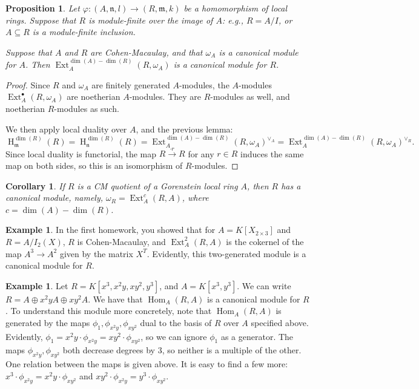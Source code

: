 \documentclass[11pt]{book}
\newtheorem{proposition}[theorem]{Proposition}
\newtheorem{corollary}[theorem]{Corollary}
\numberwithin{equation}{section}
\numberwithin{theorem}{chapter}
\theoremstyle{definition}
\newtheorem{example}[theorem]{Example}
\newtheorem*{basic properties}{Basic Properties}
\newtheorem*{Important Remark}{Important Remark}
\theoremstyle{remark}
\newcommand{\m}{\mathfrak{m}}
\newcommand{\n}{\mathfrak{n}}
\newcommand{\Hom}{\operatorname{Hom}}
\newcommand{\Ext}{\operatorname{Ext}}
\renewcommand{\dim}{\operatorname{dim}}
\renewcommand{\H}{\operatorname{H}}
\begin{document}
\begin{proposition}
	Let $\varphi:(A,\n,l) \to (R,\m,k)$ be a homomorphism of local rings. Suppose that $R$ is module-finite over the image of $A$: e.g., $R=A/I$, or $A\subseteq R$ is a module-finite inclusion.
	
	Suppose that $A$ and $R$ are Cohen-Macaulay, and that $\omega_A$ is a canonical module for $A$. Then $\Ext^{\dim(A)-\dim(R)}_A(R,\omega_A)$ is a canonical module for $R$.
\end{proposition}
\begin{proof}
	Since $R$ and $\omega_A$ are finitely generated $A$-modules, the $A$-modules $\Ext^\bullet_A(R,\omega_A)$ are noetherian $A$-modules. They are $R$-modules as well, and noetherian $R$-modules as such.
	
	We then apply local duality over $A$, and the previous lemma: 
	\[ \H^{\dim(R)}_{\m}(R) = \H^{\dim(R)}_{\n}(R) =\Ext^{\dim(A)-\dim(R)}_A(R,\omega_A)^{\vee_A} = \Ext^{\dim(A)-\dim(R)}_A(R,\omega_A)^{\vee_R}. \]
	Since local duality is functorial, the map $R \stackrel{\cdot r}{\longrightarrow} R$ for any $r\in R$ induces the same map on both sides, so this is an isomorphism of $R$-modules.
\end{proof}

\begin{corollary}
	If $R$ is a CM quotient of a Gorenstein local ring $A$, then $R$ has a canonical module, namely, $\omega_R=\Ext^c_A(R,A)$, where $c=\dim(A)-\dim(R)$.
\end{corollary}

\begin{example}
	In the first homework, you showed that for $A=K[X_{2\times 3}]$ and $R=A/I_2(X)$, $R$ is Cohen-Macaulay, and $\Ext^2_A(R,A)$ is the cokernel of the map $A^3\to A^2$ given by the matrix $X^T$.
 Evidently, this two-generated module is a canonical module for $R$. 
\end{example}

\begin{example}
	Let $R=K[x^3,x^2 y, xy^2, y^3]$, and $A=K[x^3,y^3]$. We can write $R=A\oplus x^2 y A \oplus xy^2 A$. We have that $\Hom_A(R,A)$ is a canonical module for $R$. To understand this module more concretely, note that $\Hom_A(R,A)$ is generated by the maps $\phi_1,\phi_{x^2y},\phi_{xy^2}$ dual to the basis of $R$ over $A$ specified above. Evidently, $\phi_1=x^2y \cdot \phi_{x^2 y}=x y^2 \cdot \phi_{x y^2}$, so we can ignore $\phi_1$ as a generator. The maps $\phi_{x^2y},\phi_{xy^2}$ both decrease degrees by 3, so neither is a multiple of the other. One relation between the maps is given above. It is easy to find a few more: $x^3 \cdot \phi_{x^2 y}=x^2 y \cdot \phi_{x y^2}$ and $x y^2 \cdot \phi_{x^2 y}=y^3 \cdot \phi_{x y^2}$.
\end{example}
\end{document}
